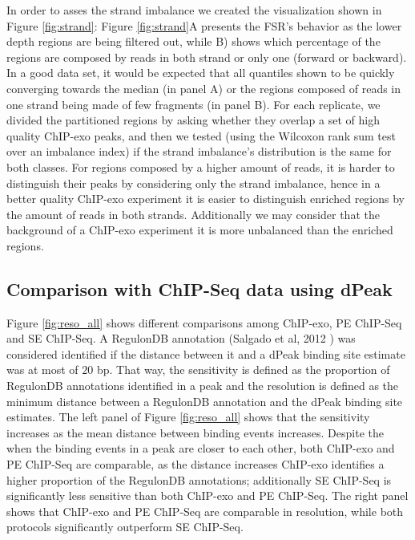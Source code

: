 \documentclass{bmcart}\usepackage[]{graphicx}\usepackage[]{color}
\begin{document}
In order to asses the strand imbalance we created the visualization
shown in Figure \ref{fig:strand}: Figure \ref{fig:strand}A presents
the FSR's behavior as the lower depth regions are being filtered out,
while B) shows which percentage of the regions are composed by reads
in both strand or only one (forward or backward). In a good data set,
it would be expected that all quantiles shown to be quickly converging
towards the median (in panel A) or the regions composed of reads in
one strand being made of few fragments (in panel B). For each
replicate, we divided the partitioned regions by asking whether they
overlap a set of high quality ChIP-exo peaks, and then we tested
(using the Wilcoxon rank sum test over an imbalance index) if the
strand imbalance's distribution is the same for both classes. For
regions composed by a higher amount of reads, it is harder to
distinguish their peaks by considering only the strand imbalance,
hence in a better quality ChIP-exo experiment it is easier to
distinguish enriched regions by the amount of reads in both
strands. Additionally we may consider that the background of a
ChIP-exo experiment it is more unbalanced than the enriched regions.

\subsection{Comparison with ChIP-Seq data using dPeak}



Figure \ref{fig:reso_all} shows different comparisons among ChIP-exo,
PE ChIP-Seq and SE ChIP-Seq. A RegulonDB annotation (Salgado et al,
2012 \cite{regulondb}) was considered identified if the distance
between it and a dPeak binding site estimate was at most of
$20$ bp. That way, the sensitivity is defined as the
proportion of RegulonDB annotations identified in a peak and the
resolution is defined as the minimum distance between a RegulonDB
annotation and the dPeak binding site estimates. The left panel of
Figure \ref{fig:reso_all} shows that the sensitivity increases as the
mean distance between binding events increases. Despite the when the
binding events in a peak are closer to each other, both ChIP-exo and
PE ChIP-Seq are comparable, as the distance increases ChIP-exo
identifies a higher proportion of the RegulonDB annotations;
additionally SE ChIP-Seq is significantly less sensitive than both
ChIP-exo and PE ChIP-Seq. The right panel shows that ChIP-exo and PE
ChIP-Seq are comparable in resolution, while both protocols
significantly outperform SE ChIP-Seq.
\end{document}
